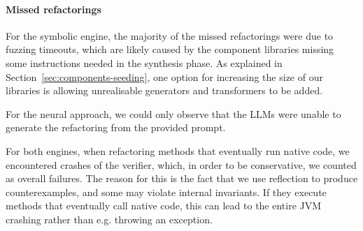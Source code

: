 \documentclass[sigconf,review,anonymous]{acmart}
\begin{document}
\paragraph{Missed refactorings}
%
%
%
For the symbolic engine, the majority of the missed refactorings were due to fuzzing timeouts, which are likely 
caused by the component libraries missing some
instructions needed in the synthesis phase.
As explained in Section~\ref{sec:components-seeding}, one option 
for increasing the size of our libraries 
is allowing unrealisable generators and transformers to
be added.

For the neural approach, we could only observe that the LLMs were unable to generate the refactoring from the provided prompt.

For both engines, when refactoring methods that eventually run native code, we encountered crashes of the verifier, which, in order to be conservative, we counted as overall failures.
The reason for this is the fact that we use reflection to produce counterexamples,
and some may violate internal invariants.
If they execute methods that eventually call native code, this can lead to the entire JVM
crashing rather than e.g. throwing an exception. %
\end{document}

